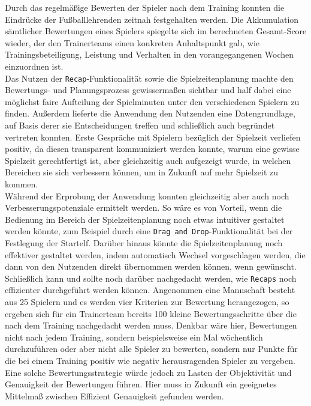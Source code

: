 Durch das regelmäßige Bewerten der Spieler nach dem Training konnten die Eindrücke der 
Fußballlehrenden zeitnah festgehalten werden. Die Akkumulation sämtlicher Bewertungen 
eines Spielers spiegelte sich im berechneten Gesamt-Score wieder, der den Trainerteams 
einen konkreten Anhaltspunkt gab, wie Trainingsbeteiligung, Leistung und Verhalten in 
den vorangegangenen Wochen einzuordnen ist. \\ 
Das Nutzen der \texttt{Recap}-Funktionalität sowie die Spielzeitenplanung machte den 
Bewertungs- und Planungsprozess gewissermaßen sichtbar und half dabei eine möglichst 
faire Aufteilung der Spielminuten unter den verschiedenen Spielern zu finden. Außerdem 
lieferte die Anwendung den Nutzenden eine Datengrundlage, auf Basis derer sie 
Entscheidungen treffen und schließlich auch begründet vertreten konnten. Erste Gespräche 
mit Spielern bezüglich der Spielzeit verliefen positiv, da diesen transparent 
kommuniziert werden konnte, warum eine gewisse Spielzeit gerechtfertigt ist, aber 
gleichzeitig auch aufgezeigt wurde, in welchen Bereichen sie sich verbessern können, 
um in Zukunft auf mehr Spielzeit zu kommen. \\ 
Während der Erprobung der Anwendung konnten gleichzeitig aber auch noch 
Verbesserungspotenziale ermittelt werden. So wäre es von Vorteil, wenn die Bedienung 
im Bereich der Spielzeitenplanung noch etwas intuitiver gestaltet werden könnte, 
zum Beispiel durch eine \texttt{Drag and Drop}-Funktionalität bei der Festlegung der 
Startelf. Darüber hinaus könnte die Spielzeitenplanung noch effektiver gestaltet werden, 
indem automatisch Wechsel vorgeschlagen werden, die dann von den Nutzenden direkt 
übernommen werden können, wenn gewünscht. \\ 
Schließlich kann und sollte noch darüber 
nachgedacht werden, wie \texttt{Recaps} noch effizienter durchgeführt werden können. 
Angenommen eine Mannschaft besteht aus 25 Spielern und es werden vier Kriterien zur 
Bewertung herangezogen, so ergeben sich für ein Trainerteam bereits 100 kleine 
Bewertungsschritte über die nach dem Training nachgedacht werden muss. Denkbar wäre 
hier, Bewertungen nicht nach jedem Training, sondern beispielsweise ein Mal wöchentlich 
durchzuführen oder aber nicht alle Spieler zu bewerten, sondern nur Punkte für die 
bei einem Training positiv wie negativ herausragenden Spieler zu vergeben. Eine solche 
Bewertungsstrategie würde jedoch zu Lasten der Objektivität und Genauigkeit der 
Bewertungen führen. Hier muss in Zukunft ein geeignetes Mittelmaß zwischen Effizient 
Genauigkeit gefunden werden. 

